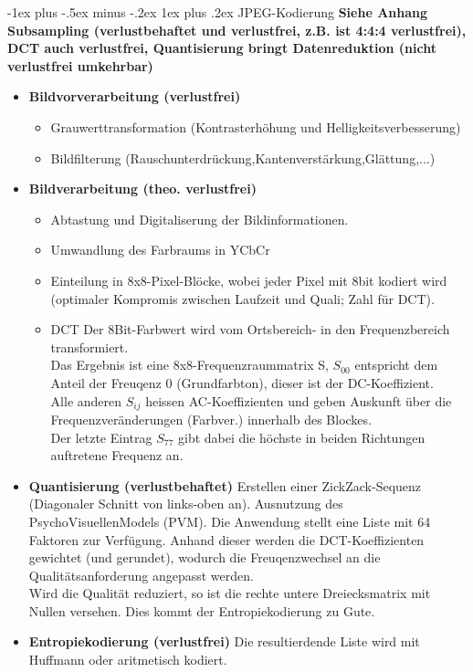 \documentclass[10pt,landscape]{article}
\makeatletter
\renewcommand{\subsubsection}{\@startsection{subsubsection}{3}{0mm}%
                                {-1ex plus -.5ex minus -.2ex}%
                                {1ex plus .2ex}%
                                {\normalfont\small\bfseries}}
\makeatother
\begin{document}
\begin{multicols}{3}
\subsubsection{JPEG-Kodierung}
\textbf{Siehe Anhang} \\
\textbf{Subsampling (verlustbehaftet und verlustfrei, z.B. ist 4:4:4 verlustfrei), DCT auch verlustfrei, Quantisierung bringt Datenreduktion (nicht verlustfrei umkehrbar)}
\begin{itemize}
    \item \textbf{Bildvorverarbeitung (verlustfrei)}
        \begin{itemize}
            \item Grauwerttransformation (Kontrasterh\"ohung und Helligkeitsverbesserung)
            \item Bildfilterung (Rauschunterdr\"uckung,Kantenverst\"arkung,Gl\"attung,...)
        \end{itemize}
    \item \textbf{Bildverarbeitung (theo. verlustfrei)}
    \begin{itemize}
        \item Abtastung und Digitaliserung der Bildinformationen.
        \item Umwandlung des Farbraums in YCbCr
        \item Einteilung in 8x8-Pixel-Bl\"ocke, wobei jeder Pixel mit 8bit kodiert wird (optimaler Kompromis zwischen Laufzeit und Quali; Zahl f\"ur DCT).
        \item DCT Der 8Bit-Farbwert wird vom Ortsbereich- in den Frequenzbereich transformiert. \\
            Das Ergebnis ist eine 8x8-Frequenzraummatrix S, $S_{00}$ entspricht dem Anteil der Freuqenz 0 (Grundfarbton), dieser ist der DC-Koeffizient.\\
            Alle anderen $S_{ij}$ heissen AC-Koeffizienten und geben Auskunft \"uber die Frequenzver\"anderungen (Farbver.) innerhalb des Blockes.\\
            Der letzte Eintrag $S_{77}$ gibt dabei die h\"ochste in beiden Richtungen auftretene Frequenz an.
    \end{itemize}
    \item \textbf{Quantisierung (verlustbehaftet)} Erstellen einer ZickZack-Sequenz (Diagonaler Schnitt von links-oben an). Ausnutzung des PsychoVisuellenModels (PVM).
        Die Anwendung stellt eine Liste mit 64 Faktoren zur Verf\"ugung. Anhand dieser werden die DCT-Koeffizienten gewichtet (und gerundet),
        wodurch die Freuqenzwechsel an die Qualit\"atsanforderung angepasst werden.\\
        Wird die Qualit\"at reduziert, so ist die rechte untere Dreiecksmatrix mit Nullen versehen. Dies kommt der Entropiekodierung zu Gute.
    \item \textbf{Entropiekodierung (verlustfrei)} Die resultierdende Liste wird mit Huffmann oder aritmetisch kodiert.    
\end{itemize}

\end{multicols}
\end{document}
